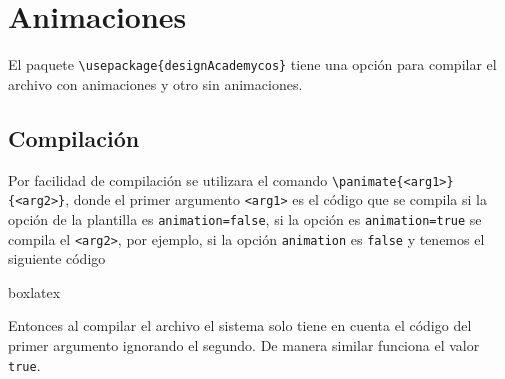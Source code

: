{\justifying
\chapter{Animaciones}\label{cap:Animaciones}
%
	El paquete \verb|\usepackage{designAcademycos}| tiene una opción para compilar el archivo con animaciones y otro sin animaciones.
	\section{Compilación}
	Por facilidad de compilación se utilizara el comando \verb|\panimate{<arg1>}{<arg2>}|, donde el primer argumento \verb|<arg1>| es el código que se compila si la opción de la plantilla es \verb|animation=false|, si la opción es \verb|animation=true| se compila el \verb|<arg2>|, por ejemplo, si la opción \verb|animation| es \verb|false| y tenemos el siguiente código
		\begin{tcblisting}{boxlatex}
		\end{tcblisting}
		Entonces al compilar el archivo el sistema solo tiene en cuenta el código del primer argumento ignorando el segundo. De manera similar funciona el valor \verb|true|.
}
